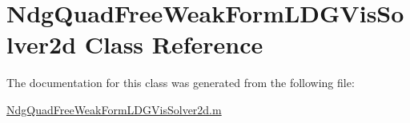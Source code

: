 \hypertarget{class_ndg_quad_free_weak_form_l_d_g_vis_solver2d}{}\section{Ndg\+Quad\+Free\+Weak\+Form\+L\+D\+G\+Vis\+Solver2d Class Reference}
\label{class_ndg_quad_free_weak_form_l_d_g_vis_solver2d}


The documentation for this class was generated from the following file\+:\begin{DoxyCompactItemize}
\item 
\hyperlink{_ndg_quad_free_weak_form_l_d_g_vis_solver2d_8m}{Ndg\+Quad\+Free\+Weak\+Form\+L\+D\+G\+Vis\+Solver2d.\+m}\end{DoxyCompactItemize}
